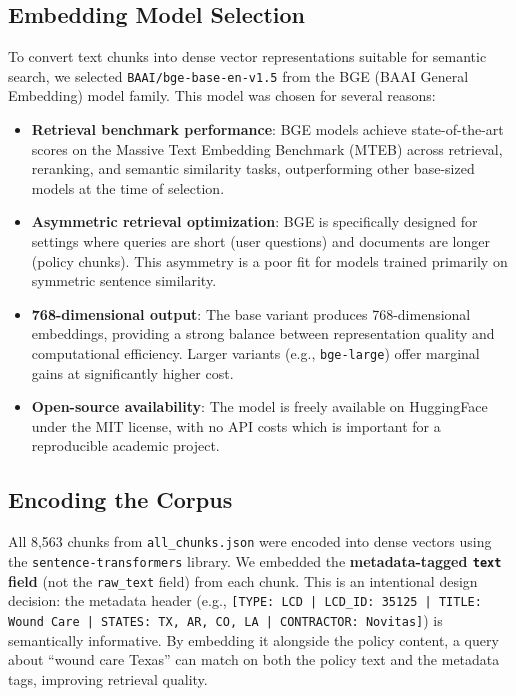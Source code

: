 \documentclass[10pt, letterpaper]{article}
\begin{document}
\subsection{Embedding Model Selection}

To convert text chunks into dense vector representations suitable for semantic search,
we selected \texttt{BAAI/bge-base-en-v1.5} from the BGE (BAAI General Embedding) model
family. This model was chosen for several reasons:

\begin{itemize}[noitemsep, topsep=4pt]
    \item \textbf{Retrieval benchmark performance}: BGE models achieve state-of-the-art
          scores on the Massive Text Embedding Benchmark (MTEB) across retrieval,
          reranking, and semantic similarity tasks, outperforming other base-sized models
          at the time of selection.
    \item \textbf{Asymmetric retrieval optimization}: BGE is specifically designed for
          settings where queries are short (user questions) and documents are longer
          (policy chunks). This asymmetry is a poor fit for models trained primarily 
          on symmetric sentence similarity.
    \item \textbf{768-dimensional output}: The base variant produces 768-dimensional
          embeddings, providing a strong balance between representation quality and
          computational efficiency. Larger variants (e.g., \texttt{bge-large}) offer
          marginal gains at significantly higher cost.
    \item \textbf{Open-source availability}: The model is freely available on HuggingFace
          under the MIT license, with no API costs which is important for a reproducible
          academic project.
\end{itemize}

\subsection{Encoding the Corpus}

All 8,563 chunks from \texttt{all\_chunks.json} were encoded into dense vectors using
the \texttt{sentence-transformers} library. We embedded the \textbf{metadata-tagged
\texttt{text} field} (not the \texttt{raw\_text} field) from each chunk. This is an
intentional design decision: the metadata header (e.g.,
\texttt{[TYPE: LCD | LCD\_ID: 35125 | TITLE: Wound Care | STATES: TX, AR, CO, LA |
CONTRACTOR: Novitas]}) is semantically informative. By embedding it alongside the
policy content, a query about ``wound care Texas'' can match on both the policy text
and the metadata tags, improving retrieval quality.
\end{document}
